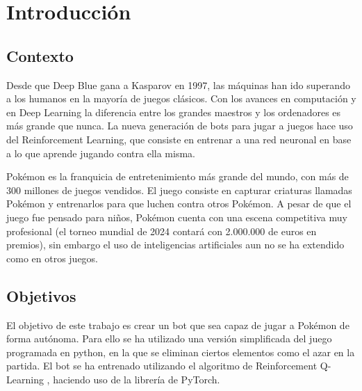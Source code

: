 \chapter{Introducción}

\section{Contexto}

Desde que Deep Blue gana a Kasparov en 1997, las máquinas han ido superando a los humanos en la mayoría de juegos clásicos. Con los avances en computación y en Deep Learning la diferencia entre los grandes maestros y los ordenadores es más grande que nunca. La nueva generación de bots para jugar a juegos hace uso del Reinforcement Learning, que consiste en entrenar a una red neuronal en base a lo que aprende jugando contra ella misma.

Pokémon es la franquicia de entretenimiento más grande del mundo, con más de 300 millones de juegos vendidos. El juego consiste en capturar criaturas llamadas Pokémon y entrenarlos para que luchen contra otros Pokémon. A pesar de que el juego fue pensado para niños, Pokémon cuenta con una escena competitiva muy profesional (el torneo mundial de 2024 contará con 2.000.000 de euros en premios), sin embargo el uso de inteligencias artificiales aun no se ha extendido como en otros juegos.

\section{Objetivos}
El objetivo de este trabajo es crear un bot que sea capaz de jugar a Pokémon de forma autónoma. Para ello se ha utilizado una versión simplificada del juego programada en python, en la que se eliminan ciertos elementos como el azar en la partida. El bot se ha entrenado utilizando el algoritmo de Reinforcement Q-Learning , haciendo uso de la librería de PyTorch.


